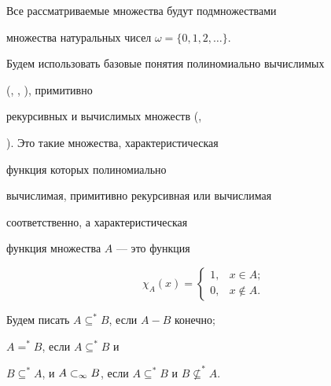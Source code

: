 

\pagestyle{plain} %







\maketitle


\label{begin}











Все рассматриваемые множества будут подмножествами 


множества натуральных чисел $\omega=\{0, 1, 2, \dotsc\}$. 


Будем использовать базовые понятия полиномиально вычислимых


(\cite{Cook}, \cite{A-S}, \cite{Karp}), примитивно 


рекурсивных и вычислимых множеств (\cite{Mal},


\cite{Soar}). Это такие множества, характеристическая 


функция которых полиномиально


вычислимая, примитивно рекурсивная или вычислимая 


соответственно, а характеристическая


функция множества $A$ --- это функция


$$


\chi_A(x)=


\begin{cases}


1, & x\in A; \\


0, & x\notin A.


\end{cases}


$$





Будем писать $A\subseteq^*B$, если $A-B$ конечно;


$A=^*B$, если $A\subseteq^*B$ и


$B\subseteq^*A$, и ${A}\subset_\infty{B}$, если $A\subseteq^*B$ и $B\nsubseteq^*A$.





